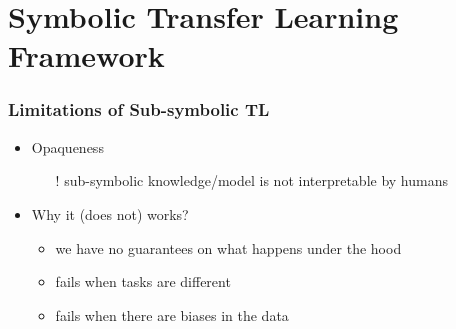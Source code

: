 \documentclass[presentation]{beamer}\mode<presentation>{\usetheme{blackAMSBolognaFC}}
\begin{document}
\section{Symbolic Transfer Learning Framework}

\begin{frame}%
\frametitle{Limitations of Sub-symbolic TL}

    \begin{itemize}
        \item Opaqueness~
        \begin{itemize}
            \item[!] sub-symbolic knowledge/model is \alert{not interpretable} by humans
        \end{itemize}

        \vfill

        \item Why it (does not) works?
        \begin{itemize}
            \item we have no guarantees on what happens under the hood
            \item fails when tasks are different
            \item fails when there are biases in the data
        \end{itemize}

    \end{itemize}

\end{frame}
\end{document}
